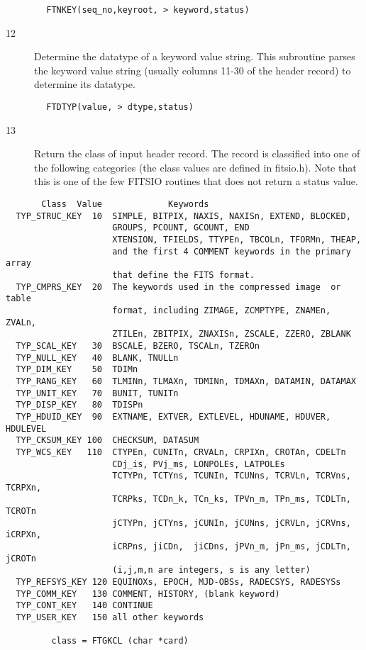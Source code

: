 \documentclass[11pt]{book}
\begin{document}
\begin{verbatim}
        FTNKEY(seq_no,keyroot, > keyword,status)
\end{verbatim}

\begin{description}
\item[12] Determine the datatype of a keyword value string.
    This subroutine parses the keyword value string (usually columns 11-30
   of the header record) to determine its datatype.
\end{description}

\begin{verbatim}
        FTDTYP(value, > dtype,status)
\end{verbatim}

\begin{description}
\item[13] Return the class of input header record.  The record is classified
    into one of the following categories (the class values are
    defined in fitsio.h).  Note that this is one of the few FITSIO
   routines that does not return a status value.
\end{description}

\begin{verbatim}
       Class  Value             Keywords
  TYP_STRUC_KEY  10  SIMPLE, BITPIX, NAXIS, NAXISn, EXTEND, BLOCKED,
                     GROUPS, PCOUNT, GCOUNT, END
                     XTENSION, TFIELDS, TTYPEn, TBCOLn, TFORMn, THEAP,
                     and the first 4 COMMENT keywords in the primary array
                     that define the FITS format.
  TYP_CMPRS_KEY  20  The keywords used in the compressed image  or table
                     format, including ZIMAGE, ZCMPTYPE, ZNAMEn, ZVALn,
                     ZTILEn, ZBITPIX, ZNAXISn, ZSCALE, ZZERO, ZBLANK
  TYP_SCAL_KEY   30  BSCALE, BZERO, TSCALn, TZEROn
  TYP_NULL_KEY   40  BLANK, TNULLn
  TYP_DIM_KEY    50  TDIMn
  TYP_RANG_KEY   60  TLMINn, TLMAXn, TDMINn, TDMAXn, DATAMIN, DATAMAX
  TYP_UNIT_KEY   70  BUNIT, TUNITn
  TYP_DISP_KEY   80  TDISPn
  TYP_HDUID_KEY  90  EXTNAME, EXTVER, EXTLEVEL, HDUNAME, HDUVER, HDULEVEL
  TYP_CKSUM_KEY 100  CHECKSUM, DATASUM
  TYP_WCS_KEY   110  CTYPEn, CUNITn, CRVALn, CRPIXn, CROTAn, CDELTn
                     CDj_is, PVj_ms, LONPOLEs, LATPOLEs
                     TCTYPn, TCTYns, TCUNIn, TCUNns, TCRVLn, TCRVns, TCRPXn,
                     TCRPks, TCDn_k, TCn_ks, TPVn_m, TPn_ms, TCDLTn, TCROTn
                     jCTYPn, jCTYns, jCUNIn, jCUNns, jCRVLn, jCRVns, iCRPXn,
                     iCRPns, jiCDn,  jiCDns, jPVn_m, jPn_ms, jCDLTn, jCROTn
                     (i,j,m,n are integers, s is any letter)
  TYP_REFSYS_KEY 120 EQUINOXs, EPOCH, MJD-OBSs, RADECSYS, RADESYSs
  TYP_COMM_KEY   130 COMMENT, HISTORY, (blank keyword)
  TYP_CONT_KEY   140 CONTINUE
  TYP_USER_KEY   150 all other keywords

         class = FTGKCL (char *card)
\end{verbatim}
\end{document}
